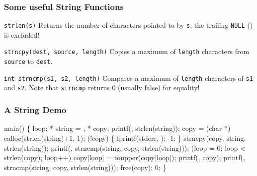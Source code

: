 \documentclass[smaller,table]{beamer}
\begin{document}
\begin{frame}
\frametitle{Some useful String Functions}
\begin{block}{\tt strlen(s)}
Returns the number of characters pointed to by {\tt s}, the trailing {\tt NULL} ({\tt {}}) is excluded!
\end{block}
\begin{block}{\tt strncpy(dest, source, length)}
Copies a maximum of {\tt length} characters from {\tt source} to {\tt dest}.
\end{block}
\begin{block}{\tt int strncmp(s1, s2, length)}
Compares a maximum of {\tt length} characters of {\tt s1} and {\tt s2}. Note that {\tt strncmp} returns 0 (usually false) for equality!
\end{block}
\end{frame}

\begin{frame}[fragile]
\frametitle{A String Demo}
\vspace{-0.2in}
\begin{semiverbatim}
\tiny
\kr\kl{} 
\kl{} 
\kl{} 
\kl{} 
\kl
\kl{} main()
\kl\{
\kl   {} loop;
\kl   {} * string = , * copy;
\kl   printf(, strlen(string));
\kl   copy = (char *) calloc(strlen(string)+1, 1);
\kl   {} (!copy)
\kl   \{
\kl      fprintf(stderr, );
\kl      {} -1;
\kl   \}
\kl   
\kl   strncpy(copy, string, strlen(string));
\kl   printf(,
\kl         strncmp(string, copy, strlen(string)));
\kl         
\kl   {} (loop = 0; loop < strlen(copy); loop++)
\kl      copy[loop] = toupper(copy[loop]);
\kl      
\kl   printf(, copy);
\kl   printf(,
\kl         strncmp(string, copy, strlen(string)));
\kl         
\kl   free(copy);
\kl   {} 0;
\kl\}
\end{semiverbatim}
\end{frame}
\end{document}

